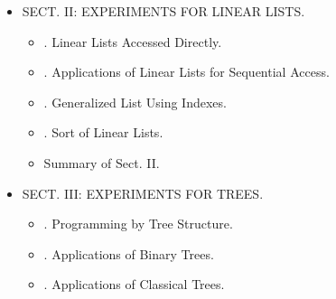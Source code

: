 \documentclass{article}
\newtheorem{problem}{Problem}
\begin{document}
\begin{itemize}
\begin{itemize}
\begin{itemize}
\begin{problem}[Sum of consecutive prime numbers]
				IDs for online judges: POJ 2739, UVA 3399.
			\end{problem}
			{\it Analysis.} Because program needs to deal with consecutive prime numbers for each test case, \& upper limit of prime numbers is $10000$, offline method can be used to solve problem. 1st, all prime numbers $< 10001$ are obtained \& stored in array {\tt prime[1 .. total]} in ascending order. Then deal with test cases 1 by 1: Suppose input number is $n$; sum of consecutive prime numbers is {\tt cnt}; number of representation for {\tt cnt == n} is {\tt ans}. A double loop is used to get number of representations for $n$:
			\begin{itemize}
				\item Outer loop $i$: {\tt for(int i = 0; n >= prime[i]; i++)} enumerates all possible minimum {\tt prime[i]}.
				\item Inner loop $j$: \verb|for(int j = i; j < total && cnt < n; j++), cnt += prime[j]|, is to calculate sum of consecutive prime numbers. If $cnt\ge n$, then loop ends, \& if {\tt cnt == n}, then number of representations is {\tt ans++}.
			\end{itemize}
			When outer loop ends, {\tt ans} is solution to test case.
		\end{itemize}
		\item {. Simple Simulation.}
		\item {. Simple Recursion.}
		\item {\sf Summary of Sect. I.}
	\end{itemize}
	\item {\sf SECT. II: EXPERIMENTS FOR LINEAR LISTS.}
	\begin{itemize}
		\item {. Linear Lists Accessed Directly.}
		\item {. Applications of Linear Lists for Sequential Access.}
		\item {. Generalized List Using Indexes.}
		\item {. Sort of Linear Lists.}
		\item {\sf Summary of Sect. II.}
	\end{itemize}
	\item {\sf SECT. III: EXPERIMENTS FOR TREES.}
	\begin{itemize}
		\item {. Programming by Tree Structure.}
		\item {. Applications of Binary Trees.}
		\item {. Applications of Classical Trees.}

\end{itemize}
\end{itemize}
\end{document}
